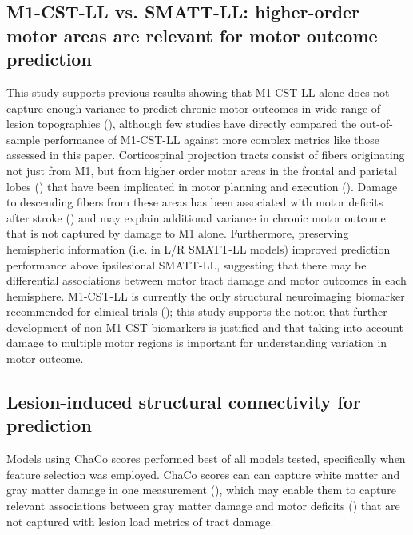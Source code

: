 \documentclass[phd,tocprelim]{cornell}
\begin{document}
\subsection{M1-CST-LL vs. SMATT-LL: higher-order motor areas are relevant for motor outcome prediction}
This study supports previous results showing that M1-CST-LL alone does not capture enough variance to predict chronic motor outcomes in wide range of lesion topographies (\cite{Rondina2017-ij, Park2016-te, Ito2022-em}), although few studies have directly compared the out-of-sample performance of M1-CST-LL against more complex metrics like those assessed in this paper. Corticospinal projection tracts consist of fibers originating not just from M1, but from higher order motor areas in the frontal and parietal lobes (\cite{Galea1994-yi}) that have been implicated in motor planning and execution (\cite{Ball1999-yo}). Damage to descending fibers from these areas has been associated with motor deficits after stroke (\cite{Ito2022-em, Riley2011-xo}) and may explain additional variance in chronic motor outcome that is not captured by damage to M1 alone. Furthermore, preserving hemispheric information (i.e. in L/R SMATT-LL models) improved prediction performance above ipsilesional SMATT-LL, suggesting that there may be differential associations between motor tract damage and motor outcomes in each hemisphere. M1-CST-LL is currently the only structural neuroimaging biomarker recommended for clinical trials (\cite{Boyd2017-gs}); this study supports the notion that further development of non-M1-CST biomarkers is justified and that taking into account damage to multiple motor regions is important for understanding variation in motor outcome.

\subsection{Lesion-induced structural connectivity for prediction}

Models using ChaCo scores performed best of all models tested, specifically when feature selection was employed. ChaCo scores can can capture white matter and gray matter damage in one measurement (\cite{Kuceyeski2013-nk}), which may enable them to capture relevant associations between gray matter damage and motor deficits (\cite{Park2016-te,Rondina2016-ds}) that are not captured with lesion load metrics of tract damage. 
\end{document}
